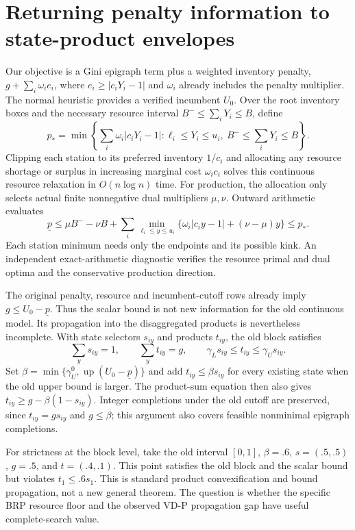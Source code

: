 \section{Returning penalty information to state-product envelopes}
\label{sec:penalty-product-feedback}

Our objective is a Gini epigraph term plus a weighted inventory penalty,
$g+\sum_i\omega_i e_i$, where $e_i\geq |c_iY_i-1|$ and $\omega_i$
already includes the penalty multiplier.  The normal heuristic provides a
verified incumbent $U_0$.  Over the root inventory boxes and the necessary
resource interval $B^-\leq\sum_iY_i\leq B$, define
\[
 p_*=\min\left\{\sum_i\omega_i|c_iY_i-1|:
 \ell_i\leq Y_i\leq u_i,\ B^-\leq\sum_iY_i\leq B\right\}.
\]
Clipping each station to its preferred inventory $1/c_i$ and allocating any
resource shortage or surplus in increasing marginal cost $\omega_i c_i$
solves this continuous resource relaxation in $O(n\log n)$ time.
For production, the allocation only selects actual finite nonnegative
dual multipliers $\mu,\nu$.  Outward arithmetic evaluates
\[
 \underline p\leq \mu B^- -\nu B+
 \sum_i\min_{\ell_i\leq y\leq u_i}
 \{\omega_i|c_iy-1|+(\nu-\mu)y\}\leq p_*.
\]
Each station minimum needs only the endpoints and its possible kink.
An independent exact-arithmetic diagnostic verifies the resource primal
and dual optima and the conservative production direction.

The original penalty, resource and incumbent-cutoff rows already imply
$g\leq U_0-\underline p$.  Thus the scalar bound is not new information
for the old continuous model.  Its propagation into the disaggregated
products is nevertheless incomplete.  With state selectors $s_{iy}$ and
products $t_{iy}$, the old block satisfies
\[
 \sum_y s_{iy}=1,\qquad \sum_y t_{iy}=g,\qquad
 \gamma_Ls_{iy}\leq t_{iy}\leq\gamma_Us_{iy}.
\]
Set $\beta=\min\{\gamma_U^0,\operatorname{up}(U_0-\underline p)\}$ and
add $t_{iy}\leq\beta s_{iy}$ for every existing state when the old upper
bound is larger.  The product-sum equation then also gives
$t_{iy}\geq g-\beta(1-s_{iy})$.  Integer completions under the old cutoff
are preserved, since $t_{iy}=gs_{iy}$ and $g\leq\beta$; this argument also
covers feasible nonminimal epigraph completions.

For strictness at the block level, take the old interval $[0,1]$,
$\beta=.6$, $s=(.5,.5)$, $g=.5$, and $t=(.4,.1)$.  This point satisfies
the old block and the scalar bound but violates $t_1\leq .6s_1$.
This is standard product convexification and bound propagation, not a new
general theorem.  The question is whether the specific BRP resource floor
and the observed VD-P propagation gap have useful complete-search value.

